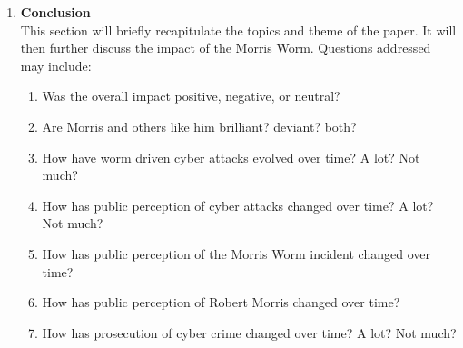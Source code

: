\begin{enumerate}
\item \textbf{Conclusion} \\
This section will briefly recapitulate the topics and theme of the paper. It will then further discuss the impact of the Morris Worm. Questions addressed may include:
	\begin{enumerate}
	\item Was the overall impact positive, negative, or neutral?
    \item Are Morris and others like him brilliant? deviant? both?
    \item How have worm driven cyber attacks evolved over time? A lot? Not much?
    \item How has public perception of cyber attacks changed over time? A lot? Not much?
    \item How has public perception of the Morris Worm incident changed over time?
    \item How has public perception of Robert Morris changed over time?
    \item How has prosecution of cyber crime changed over time? A lot? Not much?
	\end{enumerate}
\end{enumerate}